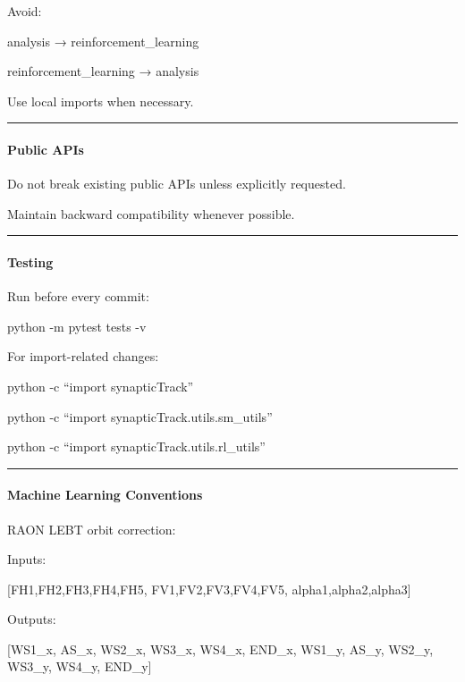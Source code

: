 \documentclass[
]{article}
\begin{document}
Avoid:

analysis → reinforcement\_learning

reinforcement\_learning → analysis

Use local imports when necessary.

\begin{center}\rule{0.5\linewidth}{0.5pt}\end{center}

\hypertarget{public-apis}{%
\paragraph{Public APIs}\label{public-apis}}

Do not break existing public APIs unless explicitly requested.

Maintain backward compatibility whenever possible.

\begin{center}\rule{0.5\linewidth}{0.5pt}\end{center}

\hypertarget{testing}{%
\paragraph{Testing}\label{testing}}

Run before every commit:

python -m pytest tests -v

For import-related changes:

python -c ``import synapticTrack''

python -c ``import synapticTrack.utils.sm\_utils''

python -c ``import synapticTrack.utils.rl\_utils''

\begin{center}\rule{0.5\linewidth}{0.5pt}\end{center}

\hypertarget{machine-learning-conventions}{%
\paragraph{Machine Learning
Conventions}\label{machine-learning-conventions}}

RAON LEBT orbit correction:

Inputs:

{[}FH1,FH2,FH3,FH4,FH5, FV1,FV2,FV3,FV4,FV5, alpha1,alpha2,alpha3{]}

Outputs:

{[}WS1\_x, AS\_x, WS2\_x, WS3\_x, WS4\_x, END\_x, WS1\_y, AS\_y, WS2\_y,
WS3\_y, WS4\_y, END\_y{]}
\end{document}
